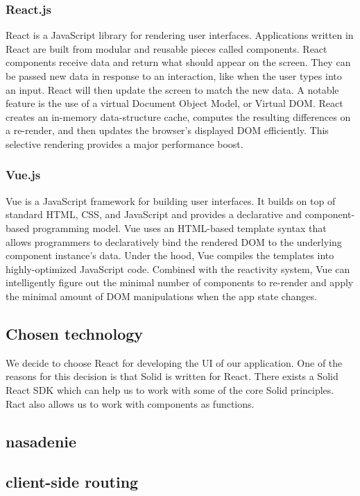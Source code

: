 \subsubsection*{React.js}
React is a JavaScript library for rendering user interfaces.
Applications written in React are built from modular and reusable pieces called components.
React components receive data and return what should appear on the screen. 
They can be passed new data in response to an interaction, like when the user types into an input. 
React will then update the screen to match the new data.
A notable feature is the use of a virtual Document Object Model, or Virtual DOM. 
React creates an in-memory data-structure cache, computes the resulting differences on a re-render, and then updates the browser's displayed DOM efficiently. 
This selective rendering provides a major performance boost.

\subsubsection*{Vue.js}
Vue is a JavaScript framework for building user interfaces. 
It builds on top of standard HTML, CSS, and JavaScript and provides a declarative and component-based programming model.
Vue uses an HTML-based template syntax that allows programmers to declaratively bind the rendered DOM to the underlying component instance's data.
Under the hood, Vue compiles the templates into highly-optimized JavaScript code. 
Combined with the reactivity system, Vue can intelligently figure out the minimal number of components to re-render and apply the minimal amount of DOM manipulations when the app state changes.

\subsection*{Chosen technology}
We decide to choose React for developing the UI of our application.
One of the reasons for this decision is that Solid is written for React.
There exists a Solid React SDK which can help us to work with some of the core Solid principles.
Ract also allows us to work with components as functions.

\subsection{nasadenie}

\subsection{client-side routing}

